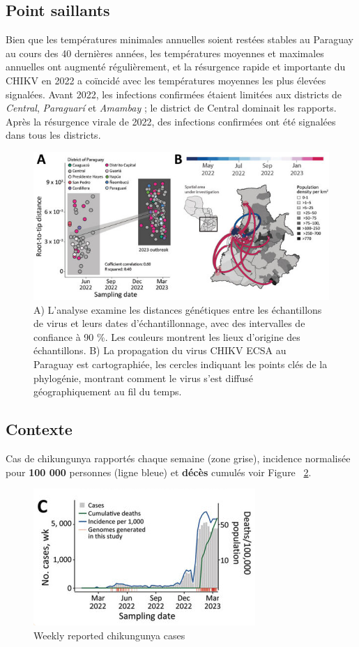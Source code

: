 \subsection{Point saillants}
Bien que les températures minimales annuelles soient restées stables au Paraguay au cours des 40 dernières années, les températures moyennes et maximales annuelles ont augmenté régulièrement, et la résurgence rapide et importante du CHIKV en 2022 a coïncidé avec les températures moyennes les plus élevées signalées. Avant 2022, les infections confirmées étaient limitées aux districts de \textit{Central}, \textit{Paraguarí} et \textit{Amambay} ; le district de Central dominait les rapports. Après la résurgence virale de 2022, des infections confirmées ont été signalées dans tous les districts.
\begin{figure}[h!]
	\centering
	\includegraphics[width=0.6\linewidth]{images/paraguay_region_cases}
	\caption[Expansion of the chikungunya East/Central/South/African lineage epidemic in Paraguay]{A) L'analyse examine les distances génétiques entre les échantillons de virus et leurs dates d'échantillonnage, avec des intervalles de confiance à 90 \%. Les couleurs montrent les lieux d'origine des échantillons. B) La propagation du virus CHIKV ECSA au Paraguay est cartographiée, les cercles indiquant les points clés de la phylogénie, montrant comment le virus s'est diffusé géographiquement au fil du temps.}
	\label{fig:paraguayregioncases}
\end{figure}
\subsection{Contexte}
Cas de chikungunya rapportés chaque semaine (zone grise), incidence normalisée pour \textbf{100 000} personnes (ligne bleue) et \textbf{décès} cumulés voir Figure ~\ref{fig:paraguaycases}.
\begin{figure}[h!]
	\centering
	\includegraphics[width=0.6\linewidth]{images/paraguay_cases}
	\caption{Weekly reported chikungunya cases}
	\label{fig:paraguaycases}
\end{figure}

